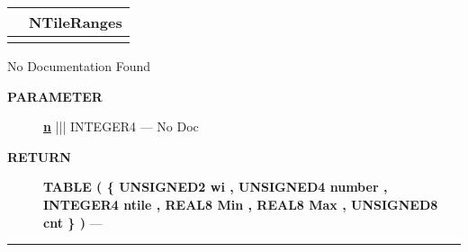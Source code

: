 {\renewcommand{\arraystretch}{1.5}
\begin{tabularx}{\textwidth}{|>{\raggedright\arraybackslash}l|X|}
\hline
\hspace{0pt}\mytexttt{\color{red} } & \textbf{NTileRanges} \\
\hline
\multicolumn{2}{|>{\raggedright\arraybackslash}X|}{\hspace{0pt}\mytexttt{\color{param} (Types.t\_Discrete n)}} \\
\hline
\end{tabularx}
}

\par





No Documentation Found






\par
\begin{description}
\item [\colorbox{tagtype}{\color{white} \textbf{\textsf{PARAMETER}}}] \textbf{\underline{n}} ||| INTEGER4 --- No Doc
\end{description}







\par
\begin{description}
\item [\colorbox{tagtype}{\color{white} \textbf{\textsf{RETURN}}}] \textbf{TABLE ( \{ UNSIGNED2 wi , UNSIGNED4 number , INTEGER4 ntile , REAL8 Min , REAL8 Max , UNSIGNED8 cnt \} )} --- 
\end{description}




\rule{\linewidth}{0.5pt}


